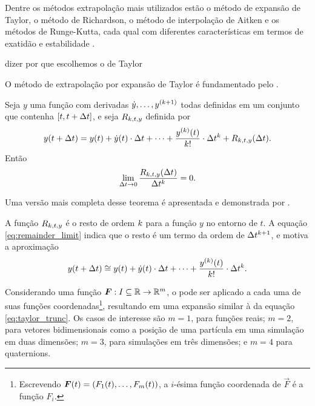 Dentre os métodos extrapolação mais utilizados estão o método de expansão de Taylor, o método de Richardson, o método de interpolação de Aitken e os métodos de Runge-Kutta, cada qual com diferentes características em termos de exatidão e estabilidade .

\alert{dizer por que escolhemos o de Taylor}

O método de extrapolação por expansão de Taylor é fundamentado pelo .

\begin{theorem} \label{theo:taylor}
	Seja \(y\) uma função com derivadas \(\deriv{1}{y},\dots,y^{\pqty{\taylorOrder+1}}\) todas definidas em um conjunto que contenha \(\bqty{t, t+\Dt}\), e seja \(R_{k, t, y}\) definida por
    \begin{equation*}
    	y(t + \Dt) = y(t) + \deriv{1}{y}(t)\cdot\Dt + \dots + \dfrac{\deriv{\taylorOrder}{y}(t)}{\taylorOrder!}\cdot\Dt^\taylorOrder + R_{\taylorOrder, t, y}(\Dt).
    \end{equation*}
    Então
    \begin{equation} \label{eq:remainder_limit}
    	\lim_{\Delta t \rightarrow 0} \dfrac{R_{k, t, y}(\Delta t)}{\Delta t^k} = 0.
    \end{equation}
\end{theorem}

Uma versão mais completa desse teorema é apresentada e demonstrada por .

A função \(R_{k, t, y}\) é o resto de ordem \(k\) para a função \(y\) no entorno de \(t\). A equação \eqref{eq:remainder_limit} indica que o resto é um termo da ordem de \(\Delta t^{k+1}\), e motiva a aproximação
\begin{equation} \label{eq:taylor_trunc}
    y(t + \Dt) \approximately y(t) + \deriv{1}{y}(t)\cdot\Dt + \dots + \dfrac{\deriv{\taylorOrder}{y}(t)}{\taylorOrder!}\cdot\Dt^\taylorOrder.
\end{equation}

Considerando uma função \(\bm{F}:I\subseteq \mathbb{R} \rightarrow \mathbb{R}^m\), o  pode ser aplicado a cada uma de suas funções coordenadas\footnote{Escrevendo \(\vec{F}(t) = \pqty{F_1(t),\dots,F_m(t)}\), a \(i\)-ésima função coordenada de \(\vec{F}\) é a função \(F_i\).}, resultando em uma expansão similar à da equação \eqref{eq:taylor_trunc}. Os casos de interesse são \(m=1\), para funções reais; \(m=2\), para vetores bidimensionais como a posição de uma partícula em uma simulação em duas dimensões; \(m=3\), para simulações em três dimensões; \alert{e \(m=4\) para quaternions}.

